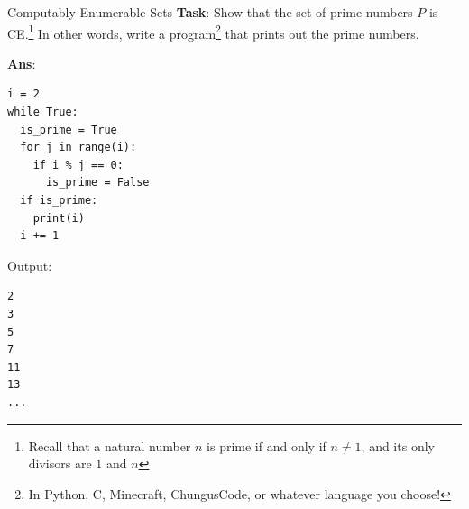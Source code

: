 \documentclass{beamer}
\begin{document}
\begin{frame}[fragile]{Computably Enumerable Sets}
\textbf{Task}: Show that the set of prime numbers $P$ is CE.\footnote{Recall that a natural number $n$ is prime if and only if $n \neq 1$, and its only divisors are $1$ and $n$} In other words, write a program\footnote{In Python, C, Minecraft, ChungusCode, or whatever language you choose!} that prints out the prime numbers.

\pause

\textbf{Ans}:

\vspace{3mm}

\begin{minipage}{0.6\textwidth}
\begin{verbatim}
i = 2
while True:
  is_prime = True
  for j in range(i):
    if i % j == 0:
      is_prime = False
  if is_prime:
    print(i)
  i += 1
\end{verbatim}
\end{minipage}
\begin{minipage}{0.3\textwidth}
Output:
\begin{verbatim}
2
3
5
7
11
13
...
\end{verbatim}
\end{minipage}
\end{frame}
\end{document}
